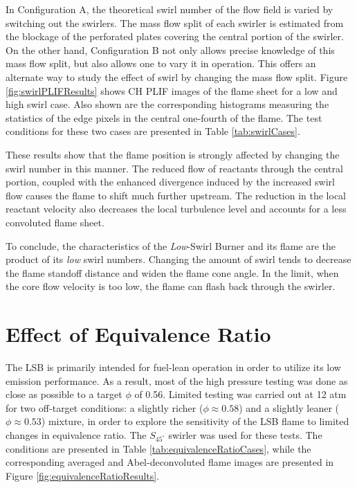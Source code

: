 In Configuration A, the theoretical swirl number of the flow field is varied by switching out the swirlers.
The mass flow split of each swirler is estimated from the blockage of the perforated plates covering the central portion of the swirler.
On the other hand, Configuration B not only allows precise knowledge of this mass flow split, but also allows one to vary it in operation.
This offers an alternate way to study the effect of swirl by changing the mass flow split.
Figure \ref{fig:swirlPLIFResults} shows CH PLIF images of the flame sheet for a low and high swirl case.
Also shown are the corresponding histograms measuring the statistics of the edge pixels in the central one-fourth of the flame.
The test conditions for these two cases are presented in Table \ref{tab:swirlCases}.




These results show that the flame position is strongly affected by changing the swirl number in this manner.
The reduced flow of reactants through the central portion, coupled with the enhanced divergence induced by the increased swirl flow causes the flame to shift much further upstream.
The reduction in the local reactant velocity also decreases the local turbulence level and accounts for a less convoluted flame sheet.

To conclude, the characteristics of the \emph{Low}-Swirl Burner and its flame are the product of its \emph{low} swirl numbers.
Changing the amount of swirl tends to decrease the flame standoff distance and widen the flame cone angle.
In the limit, when the core flow velocity is too low, the flame can flash back through the swirler.

\section{Effect of Equivalence Ratio}
\label{sec:lsb-effect-of-equivalence-ratio}

The LSB is primarily intended for fuel-lean operation in order to utilize its low  emission performance.
As a result, most of the high pressure testing was done as close as possible to a target \(\phi\) of 0.56.
Limited testing was carried out at 12 atm for two off-target conditions: a slightly richer (\(\phi \approx 0.58\)) and a slightly leaner (\(\phi \approx 0.53\)) mixture, in order to explore the sensitivity of the LSB flame to limited changes in equivalence ratio.
The \(S_{45^\circ}\) swirler was used for these tests.
The conditions are presented in Table \ref{tab:equivalenceRatioCases}, while the corresponding averaged and Abel-deconvoluted flame images are presented in Figure \ref{fig:equivalenceRatioResults}.

